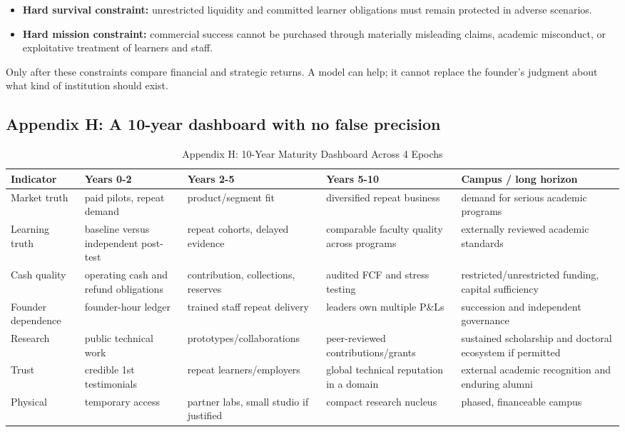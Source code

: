 \begin{itemize}[leftmargin=*,itemsep=1.5pt]
  \item \textbf{Hard survival constraint:} unrestricted liquidity and committed learner obligations must remain protected in adverse scenarios.
  \item \textbf{Hard mission constraint:} commercial success cannot be purchased through materially misleading claims, academic misconduct, or exploitative treatment of learners and staff.
\end{itemize}

Only after these constraints compare financial and strategic returns. A model can help; it cannot replace the founder's judgment about what kind of institution should exist.

\subsection{Appendix H: A 10-year dashboard with no false precision}

\begin{table}[t]
\centering
\small
\caption{Appendix H: 10-Year Maturity Dashboard Across 4 Epochs}
\label{tab:ch36_ten_year_dashboard}
\begin{tabularx}{\textwidth}{p{2.8cm} p{2.8cm} p{3.0cm} p{3.2cm} X}
\toprule
\textbf{ Indicator } & \textbf{ Years 0-2 } & \textbf{ Years 2-5 } & \textbf{ Years 5-10 } & \textbf{ Campus / long horizon } \\
\midrule
 Market truth  &  paid pilots, repeat demand  &  product/\allowbreak segment fit  &  diversified repeat business  &  demand for serious academic programs  \\
 Learning truth  &  baseline versus independent post-test  &  repeat cohorts, delayed evidence  &  comparable faculty quality across programs  &  externally reviewed academic standards  \\
 Cash quality  &  operating cash and refund obligations  &  contribution, collections, reserves  &  audited FCF and stress testing  &  restricted/\allowbreak unrestricted funding, capital sufficiency  \\
 Founder dependence  &  founder-hour ledger  &  trained staff repeat delivery  &  leaders own multiple P\&Ls  &  succession and independent governance  \\
 Research  &  public technical work  &  prototypes/\allowbreak collaborations  &  peer-reviewed contributions/\allowbreak grants  &  sustained scholarship and doctoral ecosystem if permitted  \\
 Trust  &  credible 1st testimonials  &  repeat learners/\allowbreak employers  &  global technical reputation in a domain  &  external academic recognition and enduring alumni  \\
 Physical  &  temporary access  &  partner labs, small studio if justified  &  compact research nucleus  &  phased, financeable campus  \\
\bottomrule
\end{tabularx}
\end{table}

